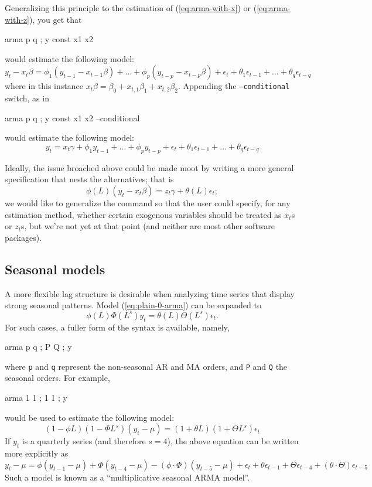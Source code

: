 Generalizing this principle to the estimation of
(\ref{eq:arma-with-x}) or (\ref{eq:arma-with-z}), you get that
\begin{code}
  arma p q ; y const x1 x2
\end{code}
would estimate the following model:
\[
  y_t - x_t \beta = \phi_1 \left(y_{t-1} - x_{t-1} \beta \right) + \ldots + 
   \phi_p \left( y_{t-p} - x_{t-p} \beta \right) + 
  \epsilon_t + \theta_1 \epsilon_{t-1} + \ldots + \theta_q \epsilon_{t-q}
\]
where in this instance $x_t \beta = \beta_0 + x_{t,1} \beta_1 +
x_{t,2} \beta_2$. Appending the \texttt{--conditional} switch, as in 
\begin{code}
  arma p q ; y const x1 x2 --conditional
\end{code}
would estimate the following model:
\[
  y_t = x_t \gamma + \phi_1 y_{t-1} + \ldots +  \phi_p y_{t-p} + 
  \epsilon_t + \theta_1 \epsilon_{t-1} + \ldots + \theta_q \epsilon_{t-q}
\]

Ideally, the issue broached above could be made moot by writing a more
general specification that nests the alternatives; that is
\begin{equation}
 \label{armax-general}
  \phi(L) \left(y_t - x_t \beta\right) = z_t \gamma  + \theta(L) \epsilon_t ;
\end{equation}
we would like to generalize the  command so that
the user could specify, for any estimation method, whether certain
exogenous variables should be treated as $x_t$s or $z_t$s, but we're
not yet at that point (and neither are most other software packages).

\subsection{Seasonal models}

A more flexible lag structure is desirable when analyzing time series
that display strong seasonal patterns. Model (\ref{eq:plain-0-arma})
can be expanded to
\begin{equation}
  \label{eq:seasonal-arma}
  \phi(L) \Phi(L^s) y_t = \theta(L) \Theta(L^s) \epsilon_t .
\end{equation}
For such cases, a fuller form of the syntax is available, namely,
\begin{code}
  arma p q ; P Q ; y
\end{code}
where \texttt{p} and \texttt{q} represent the non-seasonal AR and MA
orders, and \texttt{P} and \texttt{Q} the seasonal orders.  For
example,
\begin{code}
  arma 1 1 ; 1 1 ; y
\end{code}
would be used to estimate the following model:
\[
  (1 -\phi L)(1 -\Phi L^s) (y_t - \mu) = (1 + \theta L)(1 + \Theta L^s) \epsilon_t
\]
If $y_t$ is a quarterly series (and therefore $s=4$), the above
equation can be written more explicitly as
\[
y_t - \mu = \phi (y_{t-1} - \mu) + \Phi (y_{t-4} - \mu) - (\phi
  \cdot \Phi) (y_{t-5} - \mu) + \epsilon_t + \theta \epsilon_{t-1} + \Theta
  \epsilon_{t-4} + (\theta \cdot \Theta) \epsilon_{t-5}
\]
Such a model is known as a ``multiplicative seasonal ARMA model''.

